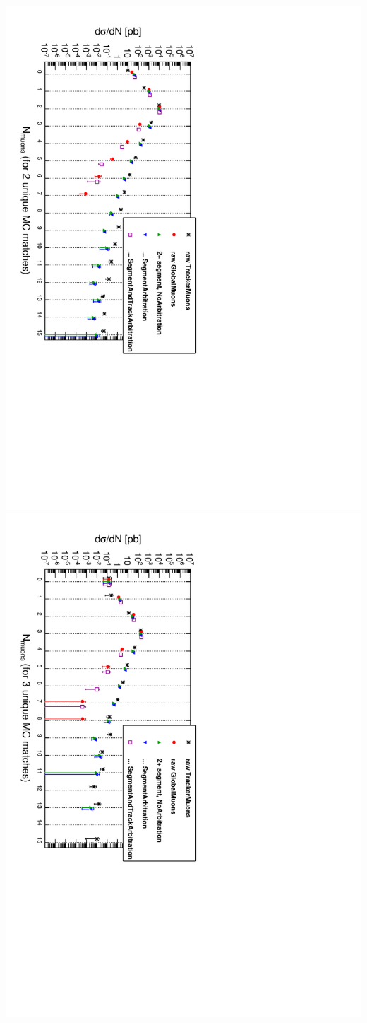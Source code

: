 \documentclass[compress]{beamer}
\begin{document}
\begin{frame}
\includegraphics[height=0.5\linewidth, angle=90]{tracks_lastpage_2real.pdf}
\includegraphics[height=0.5\linewidth, angle=90]{tracks_lastpage_3real.pdf}
\end{frame}
\end{document}
